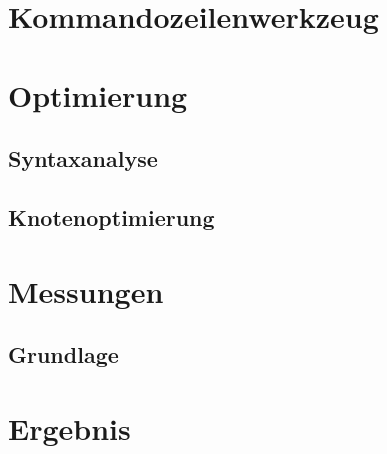 \documentclass[11pt]{scrartcl}
\begin{document}
\pagebreak

\section{Kommandozeilenwerkzeug}

\pagebreak

\section{Optimierung}

\subsection{Syntaxanalyse}
\subsection{Knotenoptimierung}

\pagebreak
\section{Messungen}
\subsection{Grundlage}
\fancyhead[R]{}

\pagebreak
\section{Ergebnis}

\thispagestyle{empty}

\renewcommand*{\biburlprefix}{(URL: }
\renewcommand*{\biburlsuffix}{)}

\pagebreak
{} %


\appendix

\end{document}

